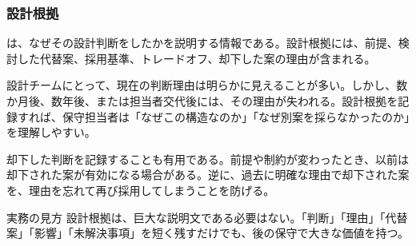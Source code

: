 \subsubsection{設計根拠}

 は、なぜその設計判断をしたかを説明する情報である。設計根拠には、前提、検討した代替案、採用基準、トレードオフ、却下した案の理由が含まれる。

設計チームにとって、現在の判断理由は明らかに見えることが多い。しかし、数か月後、数年後、または担当者交代後には、その理由が失われる。設計根拠を記録すれば、保守担当者は「なぜこの構造なのか」「なぜ別案を採らなかったのか」を理解しやすい。

却下した判断を記録することも有用である。前提や制約が変わったとき、以前は却下された案が有効になる場合がある。逆に、過去に明確な理由で却下された案を、理由を忘れて再び採用してしまうことを防げる。

\begin{pointbox}{実務の見方}
設計根拠は、巨大な説明文である必要はない。「判断」「理由」「代替案」「影響」「未解決事項」を短く残すだけでも、後の保守で大きな価値を持つ。
\end{pointbox}
